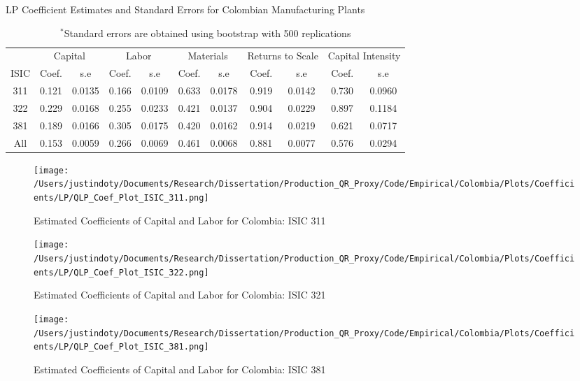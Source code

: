 \documentclass[11pt]{article}
\begin{document}
\begin{table}[H]
\centering
\caption{LP Coefficient Estimates and Standard Errors for Colombian Manufacturing Plants}
\begin{tabular}{ccccccccccc}
  \hline\hline & \multicolumn{2}{c}{Capital} & \multicolumn{2}{c}{Labor} & \multicolumn{2}{c}{Materials} & \multicolumn{2}{c}{Returns to Scale} & \multicolumn{2}{c}{Capital Intensity}\\ \cmidrule(lr){2-3} \cmidrule(lr){4-5} \cmidrule(lr){6-7} \cmidrule(lr){8-9} \cmidrule(lr){10-11}ISIC & Coef. & s.e & Coef. & s.e & Coef. & s.e & Coef. & s.e & Coef. & s.e \\ 
  \hline
311 & 0.121 & 0.0135 & 0.166 & 0.0109 & 0.633 & 0.0178 & 0.919 & 0.0142 & 0.730 & 0.0960 \\ 
  322 & 0.229 & 0.0168 & 0.255 & 0.0233 & 0.421 & 0.0137 & 0.904 & 0.0229 & 0.897 & 0.1184 \\ 
  381 & 0.189 & 0.0166 & 0.305 & 0.0175 & 0.420 & 0.0162 & 0.914 & 0.0219 & 0.621 & 0.0717 \\ 
  All & 0.153 & 0.0059 & 0.266 & 0.0069 & 0.461 & 0.0068 & 0.881 & 0.0077 & 0.576 & 0.0294 \\ 
   \hline
\end{tabular}
\caption*{\footnotesize $^{*}$Standard errors are obtained using bootstrap with 500 replications}
\label{COLLPcoef}
\end{table}

\begin{figure}[H]
\centering
\caption{Estimated Coefficients of Capital and Labor for Colombia: ISIC 311}
\texttt{[image: /Users/justindoty/Documents/Research/Dissertation/Production\_QR\_Proxy/Code/Empirical/Colombia/Plots/Coefficients/LP/QLP\_Coef\_Plot\_ISIC\_311.png]}
\label{fig:LPCOL311}
\end{figure}

\begin{figure}[H]
\centering
\caption{Estimated Coefficients of Capital and Labor for Colombia: ISIC 321}
\texttt{[image: /Users/justindoty/Documents/Research/Dissertation/Production\_QR\_Proxy/Code/Empirical/Colombia/Plots/Coefficients/LP/QLP\_Coef\_Plot\_ISIC\_322.png]}
\label{fig:LPCOL321}
\end{figure}

\begin{figure}[H]
\centering
\caption{Estimated Coefficients of Capital and Labor for Colombia: ISIC 381}
\texttt{[image: /Users/justindoty/Documents/Research/Dissertation/Production\_QR\_Proxy/Code/Empirical/Colombia/Plots/Coefficients/LP/QLP\_Coef\_Plot\_ISIC\_381.png]}
\label{fig:LPCOL381}
\end{figure}
\end{document}
